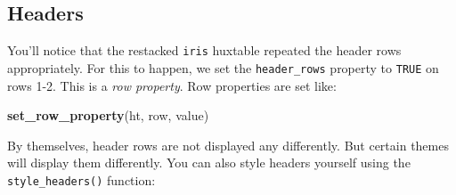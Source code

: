 \documentclass[]{article}
\newenvironment{Shaded}{\begin{snugshade}}{\end{snugshade}}
\newcommand{\DataTypeTok}[1]{\textcolor[rgb]{0.13,0.29,0.53}{#1}}
\newcommand{\DecValTok}[1]{\textcolor[rgb]{0.00,0.00,0.81}{#1}}
\newcommand{\KeywordTok}[1]{\textcolor[rgb]{0.13,0.29,0.53}{\textbf{#1}}}
\newcommand{\NormalTok}[1]{#1}
\newcommand{\OperatorTok}[1]{\textcolor[rgb]{0.81,0.36,0.00}{\textbf{#1}}}
\newcommand{\OtherTok}[1]{\textcolor[rgb]{0.56,0.35,0.01}{#1}}
\newcommand{\StringTok}[1]{\textcolor[rgb]{0.31,0.60,0.02}{#1}}
\begin{document}
\hypertarget{headers}{%
\subsection{Headers}\label{headers}}

You'll notice that the restacked \texttt{iris} huxtable repeated the
header rows appropriately. For this to happen, we set the
\texttt{header\_rows} property to \texttt{TRUE} on rows 1-2. This is a
\emph{row property}. Row properties are set like:

\begin{Shaded}
\begin{Highlighting}[]
\KeywordTok{set_row_property}\NormalTok{(ht, row, value)}
\end{Highlighting}
\end{Shaded}

\FloatBarrier

By themselves, header rows are not displayed any differently. But
certain themes will display them differently. You can also style headers
yourself using the \texttt{style\_headers()} function:

\begin{Shaded}
\end{Shaded}

 
  \providecommand{\huxb}[2]{\arrayrulecolor[RGB]{#1}\global\arrayrulewidth=#2pt}
  \providecommand{\huxvb}[2]{\color[RGB]{#1}\vrule width #2pt}
  \providecommand{\huxtpad}[1]{\rule{0pt}{#1}}
  \providecommand{\huxbpad}[1]{\rule[-#1]{0pt}{#1}}
\end{document}
